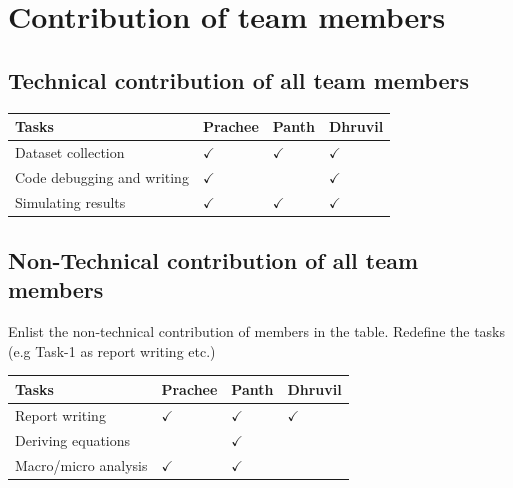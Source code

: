 \documentclass{article}
\begin{document}
\section{ Contribution of team members}
\subsection{Technical contribution of all team members }
\begin{table}[h]
\centering
\begin{tabular}{|l|l|l|l|}
\hline
Tasks              & Prachee       & Panth         & Dhruvil \\ \hline
Dataset collection &       $\checkmark$          &    $\checkmark$            &     $\checkmark$     \\ \hline
Code debugging and writing     &      $\checkmark$          &               &    $\checkmark$      \\ \hline
Simulating results &   $\checkmark$            &      $\checkmark$          &       $\checkmark$   \\ \hline
\end{tabular}
\end{table}
\subsection{Non-Technical contribution of all team members }
Enlist the non-technical contribution of members in the table. Redefine the tasks (e.g Task-1 as report writing etc.)
\begin{table}[h]
\centering
\begin{tabular}{|l|l|l|l|}
\hline
Tasks  & Prachee       & Panth         & Dhruvil \\ \hline
Report writing &     $\checkmark$          &      $\checkmark$          &   $\checkmark$              \\ \hline
Deriving equations &           &     $\checkmark$           &    \\ \hline
Macro/micro analysis&            $\checkmark$    &         $\checkmark$       &               \\ \hline
\end{tabular}
\end{table}



\end{document}
